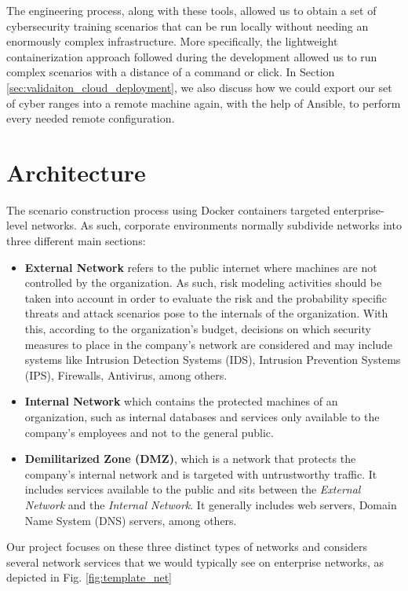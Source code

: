 The engineering process, along with these tools, allowed us to obtain a set of cybersecurity training scenarios that can be run locally without needing an enormously complex infrastructure. More specifically, the lightweight containerization approach followed during the development allowed us to run complex scenarios with a distance of a command or click. In Section \ref{sec:validaiton_cloud_deployment}, we also discuss how we could export our set of cyber ranges into a remote machine again, with the help of Ansible, to perform every needed remote configuration.

\section{Architecture} \label{sec:validation_architecture}

The scenario construction process using Docker containers targeted enterprise-level networks. As such, corporate environments normally subdivide networks into three different main sections:

\begin{itemize}
    \item \textbf{External Network} refers to the public internet where machines are not controlled by the organization. As such, risk modeling activities should be taken into account in order to evaluate the risk and the probability specific threats and attack scenarios pose to the internals of the organization. With this, according to the organization's budget, decisions on which security measures to place in the company's network are considered and may include systems like Intrusion Detection Systems (IDS), Intrusion Prevention Systems (IPS), Firewalls, Antivirus, among others.
    \item \textbf{Internal Network} which contains the protected machines of an organization, such as internal databases and services only available to the company's employees and not to the general public.
    \item \textbf{Demilitarized Zone (DMZ)}, which is a network that protects the company's internal network and is targeted with untrustworthy traffic. It includes services available to the public and sits between the \textit{External Network} and the \textit{Internal Network}. It generally includes web servers, Domain Name System (DNS) servers, among others.
\end{itemize}

Our project focuses on these three distinct types of networks and considers several network services that we would typically see on enterprise networks, as depicted in Fig. \ref{fig:template_net}


